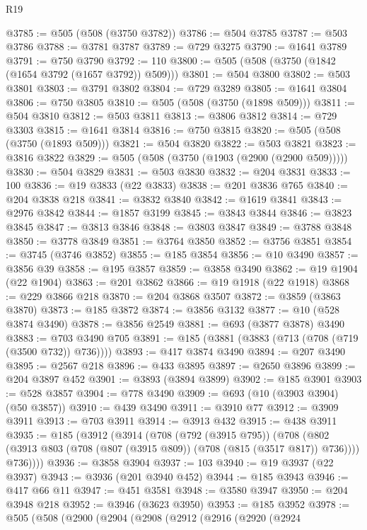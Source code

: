 \begin{lexlean}{R19}
\begin{coremodule}
{{{{{{{{{{{@3785 := @505 (@508 (@3750 @3782))
@3786 := @504 @3785
@3787 := @503 @3786
@3788 := @3781 @3787
@3789 := @729 @3275
@3790 := @1641 @3789
@3791 := @750 @3790
@3792 := 110
@3800 := @505 (@508 (@3750 (@1842 (@1654 @3792 (@1657 @3792)) @509)))
@3801 := @504 @3800
@3802 := @503 @3801
@3803 := @3791 @3802
@3804 := @729 @3289
@3805 := @1641 @3804
@3806 := @750 @3805
@3810 := @505 (@508 (@3750 (@1898 @509)))
@3811 := @504 @3810
@3812 := @503 @3811
@3813 := @3806 @3812
@3814 := @729 @3303
@3815 := @1641 @3814
@3816 := @750 @3815
@3820 := @505 (@508 (@3750 (@1893 @509)))
@3821 := @504 @3820
@3822 := @503 @3821
@3823 := @3816 @3822
@3829 := @505 (@508 (@3750 (@1903 (@2900 (@2900 @509)))))
@3830 := @504 @3829
@3831 := @503 @3830
@3832 := @204 @3831
@3833 := 100
@3836 := @19 @3833 (@22 @3833)
@3838 := @201 @3836 @765
@3840 := @204 @3838 @218
@3841 := @3832 @3840
@3842 := @1619 @3841
@3843 := @2976 @3842
@3844 := @1857 @3199
@3845 := @3843 @3844
@3846 := @3823 @3845
@3847 := @3813 @3846
@3848 := @3803 @3847
@3849 := @3788 @3848
@3850 := @3778 @3849
@3851 := @3764 @3850
@3852 := @3756 @3851
@3854 := @3745 (@3746 @3852)
@3855 := @185 @3854
@3856 := @10 @3490
@3857 := @3856 @39
@3858 := @195 @3857
@3859 := @3858 @3490
@3862 := @19 @1904 (@22 @1904)
@3863 := @201 @3862
@3866 := @19 @1918 (@22 @1918)
@3868 := @229 @3866 @218
@3870 := @204 @3868 @3507
@3872 := @3859 (@3863 @3870)
@3873 := @185 @3872
@3874 := @3856 @3132
@3877 := @10 (@528 @3874 @3490)
@3878 := @3856 @2549
@3881 := @693 (@3877 @3878) @3490
@3883 := @703 @3490 @705
@3891 := @185 (@3881 (@3883 (@713 (@708 (@719 (@3500 @732)) @736))))
@3893 := @417 @3874 @3490
@3894 := @207 @3490
@3895 := @2567 @218
@3896 := @433 @3895
@3897 := @2650 @3896
@3899 := @204 @3897 @452
@3901 := @3893 (@3894 @3899)
@3902 := @185 @3901
@3903 := @528 @3857
@3904 := @778 @3490
@3909 := @693 (@10 (@3903 @3904) (@50 @3857))
@3910 := @439 @3490
@3911 := @3910 @77
@3912 := @3909 @3911
@3913 := @703 @3911
@3914 := @3913 @432
@3915 := @438 @3911
@3935 := @185
    (@3912
      (@3914
        (@708
          (@792 (@3915 @795))
          (@708
            (@802 (@3913 @803 (@708 (@807 (@3915 @809)) (@708 (@815 (@3517 @817)) @736))))
            @736))))
@3936 := @3858 @3904
@3937 := 103
@3940 := @19 @3937 (@22 @3937)
@3943 := @3936 (@201 @3940 @452)
@3944 := @185 @3943
@3946 := @417 @66 @11
@3947 := @451 @3581
@3948 := @3580 @3947
@3950 := @204 @3948 @218
@3952 := @3946 (@3623 @3950)
@3953 := @185 @3952
@3978 := @505
    (@508
      (@2900
        (@2904
          (@2908
            (@2912
              (@2916
                (@2920
                  (@2924
}}}}}}}}}}}
\end{coremodule}
\end{lexlean}

